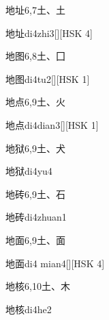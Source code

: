 \begin{entry}{地址}{6,7}{⼟、⼟}
  \begin{phonetics}{地址}{di4zhi3}[][HSK 4]
  \end{phonetics}
\end{entry}

\begin{entry}{地图}{6,8}{⼟、⼞}
  \begin{phonetics}{地图}{di4tu2}[][HSK 1]
  \end{phonetics}
\end{entry}

\begin{entry}{地点}{6,9}{⼟、⽕}
  \begin{phonetics}{地点}{di4dian3}[][HSK 1]
  \end{phonetics}
\end{entry}

\begin{entry}{地狱}{6,9}{⼟、⽝}
  \begin{phonetics}{地狱}{di4yu4}
  \end{phonetics}
\end{entry}

\begin{entry}{地砖}{6,9}{⼟、⽯}
  \begin{phonetics}{地砖}{di4zhuan1}
  \end{phonetics}
\end{entry}

\begin{entry}{地面}{6,9}{⼟、⾯}
  \begin{phonetics}{地面}{di4 mian4}[][HSK 4]
  \end{phonetics}
\end{entry}

\begin{entry}{地核}{6,10}{⼟、⽊}
  \begin{phonetics}{地核}{di4he2}
  \end{phonetics}
\end{entry}

